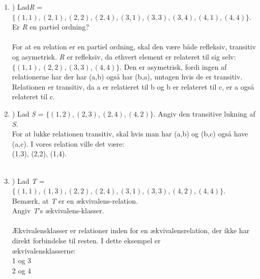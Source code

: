 \documentclass[a4paper,12pt]{article}
\begin{document}
\begin{enumerate}

	\item) Lad\textit{R} = $\lbrace(1,1),(2,1),(2,2),(2,4),(3,1),(3,3), (3,4),(4,1),(4,4)\rbrace$.
	\\Er \textit{R} en partiel ordning?
	\\
	\\For at en relation er en partiel ordning, skal den være både refleksiv, transitiv og asymetrisk. \textit{R} er refleksiv, da ethvert element er relateret til sig selv:$\lbrace(1,1),(2,2),(3,3),(4,4)\rbrace$. Den er asymetrisk, fordi ingen af relationerne har der har (a,b) også har (b,a), untagen hvis de er transitiv. Relationen er transitiv, da a er relatieret til b og b er relateret til c, er a også relateret til c.\\
	
	
	
	\item) Lad \textit{S} = $\lbrace(1, 2),(2, 3),(2, 4),(4, 2)\rbrace.$
Angiv den transitive lukning af \textit{S}.
\\For at lukke relationen transitiv, skal hvis man har (a,b) og (b,c) også have (a,c). I vores relation ville det være: 
\\(1,3), (2,2), (1,4).
\\
\\
	\item) Lad \textit{T} = $\lbrace(1, 1),(1, 3),(2, 2),(2, 4),(3, 1),(3, 3),(4, 2),(4, 4)\rbrace$.
\\Bemærk, at \textit{T} er en ækvivalens-relation.
\\Angiv \textit{T}'s ækvivalens-klasser.
\\
\\Ækvivalensklasser er relationer inden for en ækvivalensrelation, der ikke har direkt forbindelse til resten. I dette eksempel er
\\ækvivalensklasserne:
\\ 1 og 3 
\\ 2 og 4

\end{enumerate}
\end{document}
